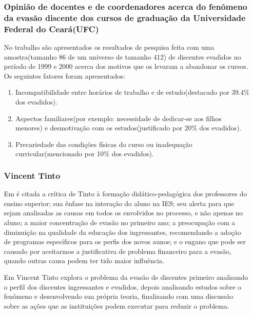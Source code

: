\documentclass{report}
\begin{document}
\subsubsection{Opinião de docentes e de coordenadores acerca do fenômeno da evasão discente dos cursos de graduação da Universidade Federal do Ceará(UFC)}

No trabalho \cite{andriola} são apresentados os resultados de pesquisa feita com uma amostra(tamanho 86 de um universo de tamanho 412) de discentes evadidos no período de 1999 e 2000 acerca dos motivos que os levaram a abandonar os cursos. Os seguintes fatores foram apresentados:

\begin{enumerate}

\item Incompatibilidade entre horários de trabalho e de estudo(destacado por 39.4\% dos evadidos).

\item Aspectos familiares(por exemplo: necessidade de dedicar-se aos filhos menores) e desmotivação com os estudos(justificado por 20\% dos evadidos).

\item Precariedade das condições físicas do curso ou inadequação curricular(mencionado por 10\% dos evadidos).

\end{enumerate}


\subsubsection{Vincent Tinto}

Em \cite{evasao_panorama2} é citada a crítica de Tinto à formação didático-pedagógica dos professores do ensino superior; sua ênfase na interação do aluno na IES; seu alerta para que sejam analisadas as causas em todos os envolvidos no processo, e não apenas no aluno; a maior concentração de evasão no primeiro ano; a preocupação com a diminuição na qualidade da educação dos ingressantes, recomendando a adoção de programas específicos para os perfis dos novos aunos; e o engano que pode ser causado por aceitarmos a justificativa de problema financeiro para a evasão, quando outras causa podem ter tido maior influência.

Em \cite{tinto_leaving} Vincent Tinto explora o problema da evasão de discentes primeiro analisando o perfil dos discentes ingressantes e evadidos, depois analisando estudos sobre o fenômeno e desenvolvendo sua própria teoria, finalizando com uma discussão sobre as ações que as instituições podem executar para reduzir o problema.
\end{document}
